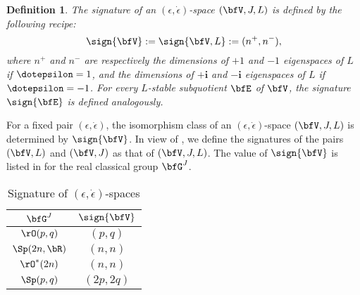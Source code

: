 \documentclass[12pt,a4paper]{amsart}
\newcommand{\Z}{\mathbb{Z}}
\numberwithin{equation}{section}
\newtheorem{defn}[thm]{Definition}
\theoremstyle{remark}
\newtheorem*{remark}{Remark}
\begin{document}



\begin{defn}\label{def:Vsign}
  The signature of an $(\epsilon, \dot \epsilon)$-space $(\bfV,J,L)$  is defined
  by the following recipe: $$\sign{\bfV} := \sign{\bfV, L}:=(n^+,n^-),$$
   where $n^+$ and $n^-$ are
  respectively the dimensions of $+1$ and $-1$ eigenspaces of $L$ if
  $\dotepsilon=1$, and the dimensions of $+\mathbf i$ and $-\mathbf i$ eigenspaces of $L$ if
  $\dotepsilon=-1$.  For every
  $L$-stable subquotient $\bfE$ of $\bfV$, the signature $\sign{\bfE}$ is
  defined analogously.
 \end{defn}


For a fixed pair $(\epsilon, \dot \epsilon)$, the isomorphism class of an $(\epsilon, \dot \epsilon)$-space $(\bfV,J,L)$ is
determined by $\sign{\bfV}$. In view of , we define the signatures of the pairs $(\bfV,L)$ and $(\bfV,J)$  as that of $(\bfV,J,L)$.
The value of $\sign{\bfV}$ is listed in  for the real classical group $\bfG^J$.
\begin{table}[h!]
\centering
\begin{tabular}{c|c}
  \hline
  $\bfG^J$ & $\sign{\bfV}$ \\
  \hline
  $\rO(p,q)$ & $(p,q)$\\
  $\Sp(2n,\bR)$ & $(n,n)$\\
  $\rO^*(2n)$ & $(n,n)$\\
  $\Sp(p,q)$ & $(2p,2q)$\\
  \hline
\end{tabular}
\vspace*{.5em}
\caption{Signature of $(\epsilon, \dot \epsilon)$-spaces}\label{tab:sign}
\end{table}



\end{document}
